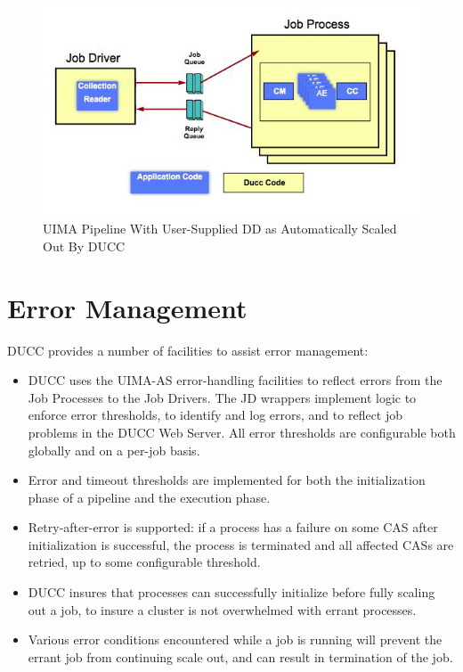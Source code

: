     \begin{figure}[H]
      \centering
      \includegraphics[width=5.5in]{images/ducc-parallel.jpg}
      \caption{UIMA Pipeline With User-Supplied DD as Automatically Scaled Out By DUCC}
      \label{fig:UIMA-AS-pipeline-DUCC-DD}
    \end{figure}

  
    \section{Error Management }
    DUCC provides a number of facilities to assist error management:
    
    \begin{itemize}
      \item DUCC uses the UIMA-AS error-handling facilities to reflect errors from the Job Processes
        to the Job Drivers. The JD wrappers implement logic to enforce error thresholds, to identify
        and log errors, and to reflect job problems in the DUCC Web Server.  All error thresholds are
        configurable both globally and on a per-job basis.

      \item Error and timeout thresholds are implemented for both the initialization phase of a pipeline
        and the execution phase.
    
      \item Retry-after-error is supported: if a process has a failure on some CAS after
        initialization is successful, the process is terminated and all affected CASs are retried, up to some
        configurable threshold.

      \item DUCC insures that processes can successfully initialize before fully scaling out a job,
        to insure a cluster is not overwhelmed with errant processes.

      \item Various error conditions encountered  while a job is running will prevent the errant job
        from continuing scale out, and can result in termination of the job.
      \end{itemize}
      
